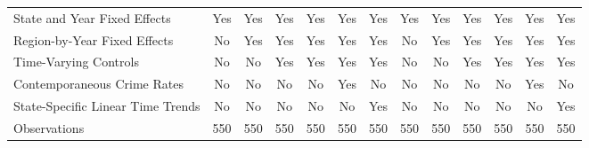 {\begin{tabular}{l*{12}{c}}
State and Year Fixed Effects &         Yes         &         Yes         &         Yes         &         Yes         &         Yes         &         Yes         &         Yes         &         Yes         &         Yes         &         Yes         &         Yes         &         Yes         \\
Region-by-Year Fixed Effects &          No         &         Yes         &         Yes         &         Yes         &         Yes         &         Yes         &          No         &         Yes         &         Yes         &         Yes         &         Yes         &         Yes         \\
Time-Varying Controls &          No         &          No         &         Yes         &         Yes         &         Yes         &         Yes         &          No         &          No         &         Yes         &         Yes         &         Yes         &         Yes         \\
Contemporaneous Crime Rates &          No         &          No         &          No         &          No         &         Yes         &          No         &          No         &          No         &          No         &          No         &         Yes         &          No         \\
State-Specific Linear Time Trends &          No         &          No         &          No         &          No         &          No         &         Yes         &          No         &          No         &          No         &          No         &          No         &         Yes         \\
\hline
Observations        &         550         &         550         &         550         &         550         &         550         &         550         &         550         &         550         &         550         &         550         &         550         &         550         \\
\hline\hline
\end{tabular}
}
